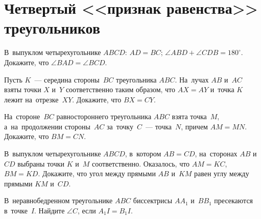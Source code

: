 
\section*{Четвертый <<признак равенства>> треугольников}


\begin{problems}

\item
В~выпуклом четырехугольнике $ABCD$:
$AD = BC$; $\angle ABD + \angle CDB = 180^{\circ}$.
Докажите, что $\angle BAD = \angle BCD$.

\item
Пусть $K$~--- середина стороны~$BC$ треугольника $ABC$.
На~лучах $AB$ и~$AC$ взяты точки $X$ и~$Y$ соответственно таким образом, что
$AX = AY$ и~точка $K$ лежит на~отрезке~$XY$.
Докажите, что $BX = CY$.

\item
На~стороне~$BC$ равностороннего треугольника $ABC$ взята точка~$M$,
а~на~продолжении стороны~$AC$ за~точку~$C$~--- точка~$N$, причем $AM = MN$.
Докажите, что $BM = CN$.

\item
В~выпуклом четырехугольнике $ABCD$, в~котором $AB = CD$, на~сторонах $AB$
и~$CD$ выбраны точки $K$ и~$M$ соответственно.
Оказалось, что $AM = KC$, $BM = KD$.
Докажите, что угол между прямыми $AB$ и~$KM$ равен углу между
прямыми $KM$ и~$CD$.

\item
В~неравнобедренном треугольнике $ABC$ биссектрисы $A A_1$ и~$B B_1$ пресекаются
в~точке~$I$.
Найдите $\angle C$, если $A_1 I = B_1 I$.


\end{problems}


